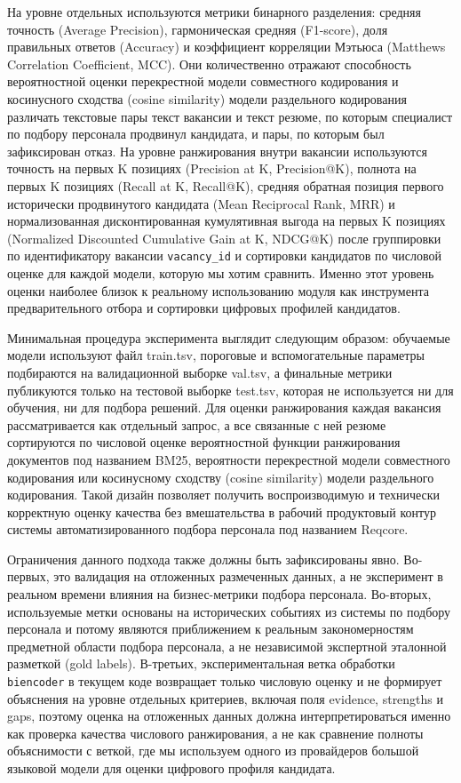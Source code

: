 На уровне отдельных используются метрики бинарного разделения: средняя точность (Average Precision), гармоническая средняя (F1-score), доля правильных ответов (Accuracy) и коэффициент корреляции Мэтьюса (Matthews Correlation Coefficient, MCC). Они количественно отражают способность вероятностной оценки перекрестной модели совместного кодирования и косинусного сходства (cosine similarity) модели раздельного кодирования различать текстовые пары текст вакансии и текст резюме, по которым специалист по подбору персонала продвинул кандидата, и пары, по которым был зафиксирован отказ. На уровне ранжирования внутри вакансии используются точность на первых K позициях (Precision at K, Precision@K), полнота на первых K позициях (Recall at K, Recall@K), средняя обратная позиция первого исторически продвинутого кандидата (Mean Reciprocal Rank, MRR) и нормализованная дисконтированная кумулятивная выгода на первых K позициях (Normalized Discounted Cumulative Gain at K, NDCG@K) после группировки по идентификатору вакансии \texttt{vacancy\_id} и сортировки кандидатов по числовой оценке для каждой модели, которую мы хотим сравнить. Именно этот уровень оценки наиболее близок к реальному использованию модуля как инструмента предварительного отбора и сортировки цифровых профилей кандидатов.

Минимальная процедура эксперимента выглядит следующим образом: обучаемые модели используют файл train.tsv, пороговые и вспомогательные параметры подбираются на валидационной выборке val.tsv, а финальные метрики публикуются только на тестовой выборке test.tsv, которая не используется ни для обучения, ни для подбора решений. Для оценки ранжирования каждая вакансия рассматривается как отдельный запрос, а все связанные с ней резюме сортируются по числовой оценке вероятностной функции ранжирования документов под названием BM25, вероятности перекрестной модели совместного кодирования или косинусному сходству (cosine similarity) модели раздельного кодирования. Такой дизайн позволяет получить воспроизводимую и технически корректную оценку качества без вмешательства в рабочий продуктовый контур системы автоматизированного подбора персонала под названием Reqcore.

Ограничения данного подхода также должны быть зафиксированы явно. Во-первых, это валидация на отложенных размеченных данных, а не эксперимент в реальном времени влияния на бизнес-метрики подбора персонала. Во-вторых, используемые метки основаны на исторических событиях из системы по подбору персонала и потому являются приближением к реальным закономерностям предметной области подбора персонала, а не независимой экспертной эталонной разметкой (gold labels). В-третьих, экспериментальная ветка обработки \texttt{biencoder} в текущем коде возвращает только числовую оценку и не формирует объяснения на уровне отдельных критериев, включая поля evidence, strengths и gaps, поэтому оценка на отложенных данных должна интерпретироваться именно как проверка качества числового ранжирования, а не как сравнение полноты объяснимости с веткой, где мы используем одного из провайдеров большой языковой модели для оценки цифрового профиля кандидата.

